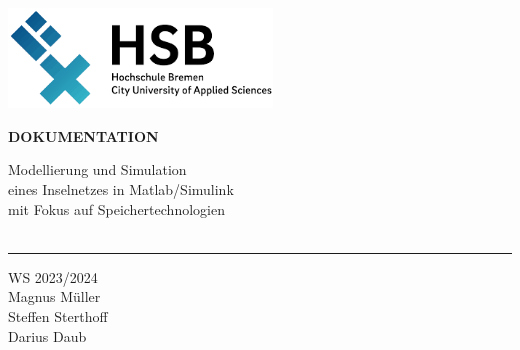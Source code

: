 \begin{titlepage}
    \raggedright
    \hfill\includegraphics[width=7cm]{HSB.png}\\
  
    \vspace{5cm}
  
    \setmainfont{Open Sans}
    \small
    \textbf{DOKUMENTATION}
  
    \vspace{8mm}
  
    \begin{minipage}{0.8\linewidth}
      \LARGE
      Modellierung und Simulation\\[1mm]
      eines Inselnetzes in Matlab/Simulink\\[1mm]
      mit Fokus auf Speichertechnologien\\[1mm]
      \,\rule{11mm}{1.2mm}
    \end{minipage}
  
    \vspace{1cm}
  
    WS 2023/2024\\
    Magnus Müller \\
    Steffen Sterthoff \\
    Darius Daub
  

\end{titlepage}
